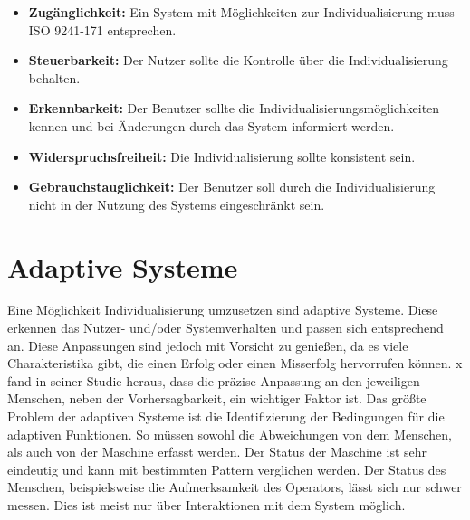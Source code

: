 \begin{itemize}
\item \textbf{Zugänglichkeit:} Ein System mit Möglichkeiten zur Individualisierung muss ISO 9241-171 entsprechen.
\item \textbf{Steuerbarkeit:} Der Nutzer sollte die Kontrolle über die Individualisierung behalten.
\item \textbf{Erkennbarkeit:} Der Benutzer sollte die Individualisierungsmöglichkeiten kennen und bei Änderungen durch das System informiert werden.
\item \textbf{Widerspruchsfreiheit:} Die Individualisierung sollte konsistent sein.
\item \textbf{Gebrauchstauglichkeit:} Der Benutzer soll durch die Individualisierung nicht in der Nutzung des Systems eingeschränkt sein.
\end{itemize}

\section{Adaptive Systeme}
Eine Möglichkeit Individualisierung umzusetzen sind adaptive Systeme. Diese erkennen das Nutzer- und/oder Systemverhalten und passen sich entsprechend an. Diese Anpassungen sind jedoch mit Vorsicht zu genießen, da es viele Charakteristika gibt, die einen Erfolg oder einen Misserfolg hervorrufen können. x fand in seiner Studie heraus, dass die präzise Anpassung an den jeweiligen Menschen, neben der Vorhersagbarkeit, ein wichtiger Faktor ist. Das größte Problem der adaptiven Systeme ist die Identifizierung der Bedingungen für die adaptiven Funktionen. So müssen sowohl die Abweichungen von dem Menschen, als auch von der Maschine erfasst werden. Der Status der Maschine ist sehr eindeutig und kann mit bestimmten Pattern verglichen werden. Der Status des Menschen, beispielsweise die Aufmerksamkeit des Operators, lässt sich nur schwer messen. Dies ist meist nur über Interaktionen mit dem System möglich.

